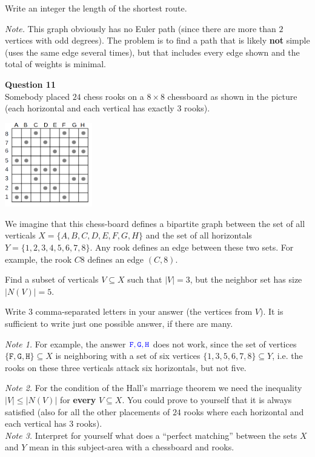 \documentclass[jou]{apa6}
\begin{document}
Write an integer \textendash{} the length of the shortest route.

{\em Note.} This graph obviously has no Euler path (since there
are more than $2$ vertices with odd degrees). The problem is to 
find a path that is likely {\bf not} simple 
(uses the same edge several times), 
but that includes every edge shown and the total of weights is minimal. 





\vspace{10pt}
{\bf Question 11}\\
Somebody placed $24$ chess rooks on a $8 \times 8$ chessboard as shown in the picture 
(each horizontal and each vertical has exactly $3$ rooks). 
\begin{center}
\includegraphics[width=1.5in]{quiz11/rooks.png}
\end{center}
We imagine that this chess-board defines a bipartite graph between the  
set of all verticals $X= \{ A,B,C,D,E,F,G,H \}$ and the set of all 
horizontals $Y= \{ 1,2,3,4,5,6,7,8 \}$. Any rook defines an edge between these two sets. 
For example, the rook $C8$ defines an edge $(C,8)$. 

Find a subset of verticals $V \subseteq X$ such that $|V|=3$, but
the neighbor set has size $|N(V)| = 5$.

Write $3$ comma-separated letters in your answer (the vertices from $V$). It is 
sufficient to write just one possible answer, if there are many.

\vspace{10pt}
{\em Note 1.} For example, the answer $\textcolor{blue}{\mathtt{F,G,H}}$ does not work, 
since the set of vertices $\{ \mathtt{F},\mathtt{G},\mathtt{H} \} \subseteq X$ 
is neighboring with a set of six vertices
$\{ 1,3,5,6,7,8 \} \subseteq Y$, i.e. the rooks on these three verticals
attack six horizontals, but not five.

{\em Note 2.} For the condition of the Hall's marriage theorem we need the inequality $|V| \leq |N(V)|$ 
for {\bf every} $V \subseteq X$. You could prove to yourself that it is always satisfied
(also for all the other placements of $24$ rooks where each horizontal and each 
vertical has $3$ rooks).\\
{\em Note 3.} Interpret for yourself what does a ``perfect matching'' between the sets
$X$ and $Y$ mean in this subject-area with a chessboard and rooks.
\end{document}
